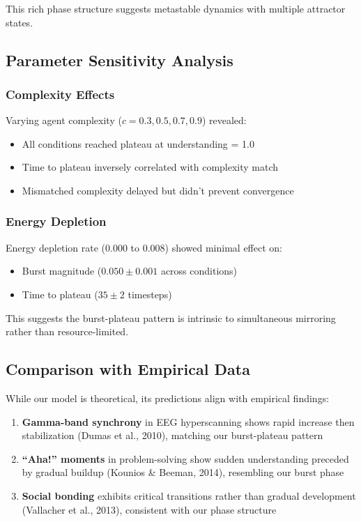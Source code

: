 \documentclass[12pt]{article}
\begin{document}
This rich phase structure suggests metastable dynamics with multiple attractor states.

\subsection{Parameter Sensitivity Analysis}

\subsubsection{Complexity Effects}

Varying agent complexity ($c = 0.3, 0.5, 0.7, 0.9$) revealed:
\begin{itemize}
\item All conditions reached plateau at understanding = 1.0
\item Time to plateau inversely correlated with complexity match
\item Mismatched complexity delayed but didn't prevent convergence
\end{itemize}

\subsubsection{Energy Depletion}

Energy depletion rate (0.000 to 0.008) showed minimal effect on:
\begin{itemize}
\item Burst magnitude ($0.050 \pm 0.001$ across conditions)
\item Time to plateau ($35 \pm 2$ timesteps)
\end{itemize}

This suggests the burst-plateau pattern is intrinsic to simultaneous mirroring rather than resource-limited.

\subsection{Comparison with Empirical Data}

While our model is theoretical, its predictions align with empirical findings:

\begin{enumerate}
\item \textbf{Gamma-band synchrony} in EEG hyperscanning shows rapid increase then stabilization (Dumas et al., 2010), matching our burst-plateau pattern

\item \textbf{``Aha!'' moments} in problem-solving show sudden understanding preceded by gradual buildup (Kounios \& Beeman, 2014), resembling our burst phase

\item \textbf{Social bonding} exhibits critical transitions rather than gradual development (Vallacher et al., 2013), consistent with our phase structure
\end{enumerate}
\end{document}
